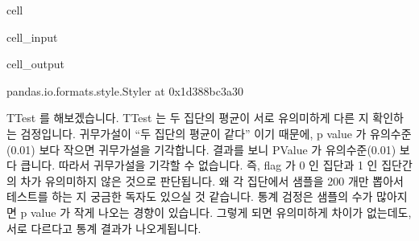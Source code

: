 \documentclass[letterpaper,10pt,english]{jupyterBook}
\begin{document}
\begin{sphinxuseclass}{cell}\begin{sphinxVerbatimInput}

\begin{sphinxuseclass}{cell_input}
\begin{sphinxVerbatim}[commandchars=\\\{\}]
  
\PYG{p}{[}\PYG{p}{]}
\end{sphinxVerbatim}

\end{sphinxuseclass}\end{sphinxVerbatimInput}
\begin{sphinxVerbatimOutput}

\begin{sphinxuseclass}{cell_output}
\begin{sphinxVerbatim}[commandchars=\\\{\}]
\PYGZlt{}pandas.io.formats.style.Styler at 0x1d388bc3a30\PYGZgt{}
\end{sphinxVerbatim}

\end{sphinxuseclass}\end{sphinxVerbatimOutput}

\end{sphinxuseclass}
\sphinxAtStartPar
T\sphinxhyphen{}Test 를 해보겠습니다. T\sphinxhyphen{}Test 는 두 집단의 평균이 서로 유의미하게 다른 지 확인하는 검정입니다. 귀무가설이 “두 집단의 평균이 같다” 이기 때문에,  p \sphinxhyphen{}value 가 유의수준(0.01) 보다 작으면 귀무가설을 기각합니다. 결과를 보니 P\sphinxhyphen{}Value 가 유의수준(0.01) 보다 큽니다. 따라서 귀무가설을 기각할 수 없습니다. 즉, flag 가 0 인 집단과 1 인 집단간의 차가 유의미하지 않은 것으로 판단됩니다. 왜 각 집단에서 샘플을 200 개만 뽑아서 테스트를 하는 지 궁금한 독자도 있으실 것 같습니다. 통계 검정은 샘플의 수가 많아지면 p value 가 작게 나오는 경향이 있습니다. 그렇게 되면 유의미하게 차이가 없는데도, 서로 다르다고 통계 결과가 나오게됩니다.
\end{document}
